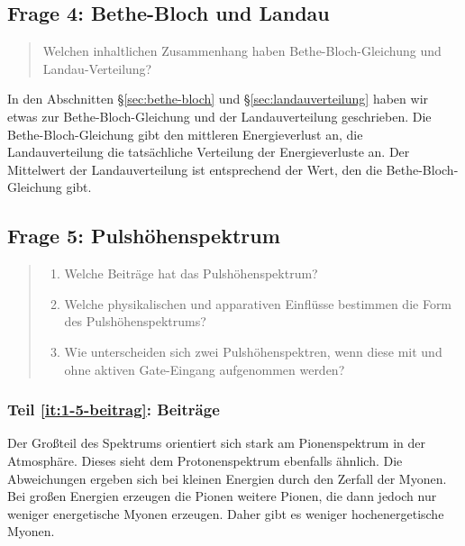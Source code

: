 \documentclass[11pt, ngerman, fleqn, DIV=15, headinclude, BCOR=2cm]{scrreprt}
\begin{document}
\subsection{Frage 4: Bethe-Bloch und Landau}

\begin{quote}
    Welchen inhaltlichen Zusammenhang haben Bethe-Bloch-Gleichung und
    Landau-Verteilung?
\end{quote}

In den Abschnitten §\ref{sec:bethe-bloch} und §\ref{sec:landauverteilung} haben
wir etwas zur Bethe-Bloch-Gleichung und der Landauverteilung geschrieben. Die
Bethe-Bloch-Gleichung gibt den mittleren Energieverlust an, die
Landauverteilung die tatsächliche Verteilung der Energieverluste an. Der
Mittelwert der Landauverteilung ist entsprechend der Wert, den die
Bethe-Bloch-Gleichung gibt.

\subsection{Frage 5: Pulshöhenspektrum}

\begin{quote}
    \begin{enumerate}
        \item
            \label{it:1-5-beitrag}
            Welche Beiträge hat das Pulshöhenspektrum?

        \item
            \label{it:1-5-einfluss}
            Welche physikalischen und apparativen Einflüsse bestimmen die Form
            des Pulshöhenspektrums?

        \item
            \label{it:1-5-unterschied}
            Wie unterscheiden sich zwei Pulshöhenspektren, wenn diese mit und
            ohne aktiven Gate-Eingang aufgenommen werden?
    \end{enumerate}
\end{quote}

\subsubsection{Teil \ref{it:1-5-beitrag}: Beiträge}

Der Großteil des Spektrums orientiert sich stark am Pionenspektrum in der
Atmosphäre. Dieses sieht dem Protonenspektrum ebenfalls ähnlich. Die Abweichungen ergeben sich bei kleinen Energien durch den
Zerfall der Myonen. Bei großen Energien erzeugen die Pionen weitere Pionen, die
dann jedoch nur weniger energetische Myonen erzeugen. Daher gibt es weniger
hochenergetische Myonen. \parencite[§6.1, §7.2]{Grupen/Astroteilchenphysik}
\end{document}
